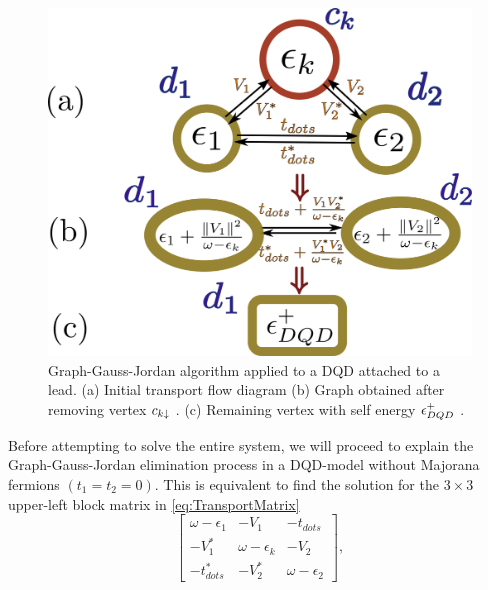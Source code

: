 \documentclass[showpacs,aps,prb,reprint,superscriptaddress]{revtex4-2}
\begin{document}
        \begin{figure}[t]
        \begin{center}
        \includegraphics[scale=0.25]{Graficos/Graph_DQD-Pro.png}
        \caption{ Graph-Gauss-Jordan  algorithm applied  to  a DQD attached to a lead. (a) Initial transport flow diagram  (b) Graph obtained after removing vertex $c_{k\downarrow}$ .  (c) Remaining vertex with self energy $\epsilon^+_{DQD}$ .
        }
        \label{fig:GraphsDQD}
        \end{center}
        \end{figure}




Before attempting to solve the entire system, we will proceed to explain the  Graph-Gauss-Jordan \cite{spielman_algorithms_2010} elimination  process  in a  DQD-model without Majorana fermions $(t_1= t_2=0)$. This is equivalent to find the solution for the $3\times 3$ upper-left block matrix in \eqref{eq:TransportMatrix} 
\begin{equation}
        \left[\begin{array}{ccc}
    \omega-\epsilon_{1} & -V_{1} & -t_{dots}\\
    -V_{1}^{*} & \omega-\epsilon_{k} & -V_{2}\\
    -t_{dots}^{*} & -V_{2}^{*} & \omega-\epsilon_{2}
    \end{array}\right], \label{eq:DQDMatrix}
\end{equation}
\end{document}
